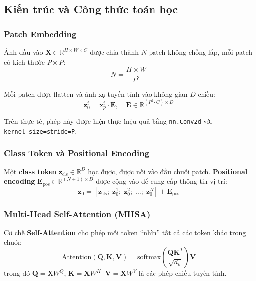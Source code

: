 \documentclass[a4paper]{article}
\newcommand{\code}[1]{\texttt{\textcolor{blue!80!black}{#1}}}
\theoremstyle{definition}
\begin{document}
\subsection{Kiến trúc và Công thức toán học}

\subsubsection{Patch Embedding}
Ảnh đầu vào $\mathbf{X} \in \mathbb{R}^{H \times W \times C}$ được chia thành $N$ patch không chồng lấp, mỗi patch có kích thước $P \times P$:
\begin{equation}
	N = \frac{H \times W}{P^2}
	\label{eq:num-patches}
\end{equation}

Mỗi patch được flatten và ánh xạ tuyến tính vào không gian $D$ chiều:
\begin{equation}
	\mathbf{z}_0^i = \mathbf{x}_p^i \cdot \mathbf{E}, \quad \mathbf{E} \in \mathbb{R}^{(P^2 \cdot C) \times D}
	\label{eq:patch-embed}
\end{equation}

Trên thực tế, phép này được hiện thực hiệu quả bằng \code{nn.Conv2d} với \code{kernel\_size=stride=P}.

\subsubsection{Class Token và Positional Encoding}
Một \textbf{class token} $\mathbf{z}_{\text{cls}} \in \mathbb{R}^D$ học được, được nối vào đầu chuỗi patch. \textbf{Positional encoding} $\mathbf{E}_{\text{pos}} \in \mathbb{R}^{(N+1) \times D}$ được cộng vào để cung cấp thông tin vị trí:
\begin{equation}
	\mathbf{z}_0 = [\mathbf{z}_{\text{cls}}; \; \mathbf{z}_0^1; \; \mathbf{z}_0^2; \; \ldots; \; \mathbf{z}_0^N] + \mathbf{E}_{\text{pos}}
	\label{eq:vit-input}
\end{equation}

\subsubsection{Multi-Head Self-Attention (MHSA)}
Cơ chế \textbf{Self-Attention} cho phép mỗi token ``nhìn'' tất cả các token khác trong chuỗi:
\begin{equation}
	\text{Attention}(\mathbf{Q}, \mathbf{K}, \mathbf{V}) = \text{softmax}\left(\frac{\mathbf{Q}\mathbf{K}^T}{\sqrt{d_k}}\right) \mathbf{V}
	\label{eq:attention}
\end{equation}
trong đó $\mathbf{Q} = \mathbf{X}W^Q$, $\mathbf{K} = \mathbf{X}W^K$, $\mathbf{V} = \mathbf{X}W^V$ là các phép chiếu tuyến tính.
\end{document}
